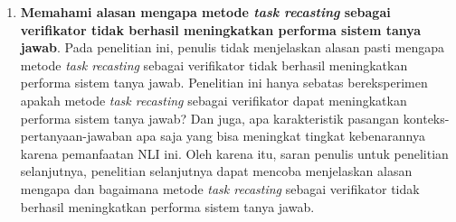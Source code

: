 \begin{enumerate}
    \item \textbf{Memahami alasan mengapa metode \emph{task recasting} sebagai verifikator tidak berhasil meningkatkan performa sistem tanya jawab}. Pada penelitian ini, penulis tidak menjelaskan alasan pasti mengapa metode \emph{task recasting} sebagai verifikator tidak berhasil meningkatkan performa sistem tanya jawab. Penelitian ini hanya sebatas bereksperimen apakah metode \emph{task recasting} sebagai verifikator dapat meningkatkan performa sistem tanya jawab? Dan juga, apa karakteristik pasangan konteks-pertanyaan-jawaban apa saja yang bisa meningkat tingkat kebenarannya karena pemanfaatan NLI ini. Oleh karena itu, saran penulis untuk penelitian selanjutnya, penelitian selanjutnya dapat mencoba menjelaskan alasan mengapa dan bagaimana metode \emph{task recasting} sebagai verifikator tidak berhasil meningkatkan performa sistem tanya jawab.
    
\end{enumerate}